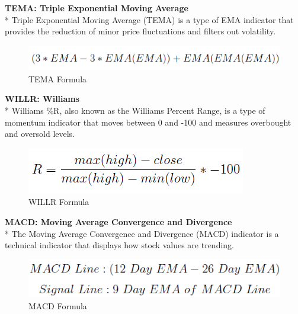 \documentclass{article}
\begin{document}
\noindent
\textbf{TEMA: Triple Exponential Moving Average} \\*
Triple Exponential Moving Average (TEMA) is a type of EMA indicator that provides the reduction of minor price fluctuations and filters out volatility.
\begin{figure}[H]
\begin{center}
   \includegraphics[scale=0.7]{Assets/tema.png}
   \caption{TEMA Formula}
\end{center}
\end{figure}
\noindent
\textbf{WILLR: Williams} \\*
Williams \%R, also known as the Williams Percent Range, is a type of momentum indicator that moves between 0 and -100 and measures overbought and oversold levels.
\begin{figure}[H]
\begin{center}
    \includegraphics[scale=0.8]{Assets/willr.png}
    \caption{WILLR Formula}
\end{center}
\end{figure}
\noindent
\textbf{MACD: Moving Average Convergence and Divergence} \\*
The Moving Average Convergence and Divergence (MACD) indicator is a technical indicator that displays how stock values are trending.
\begin{figure}[H]
\begin{center}
    \includegraphics[scale=0.8]{Assets/macd.png}
    \caption{MACD Formula}
\end{center}
\end{figure}
\noindent
\end{document}
